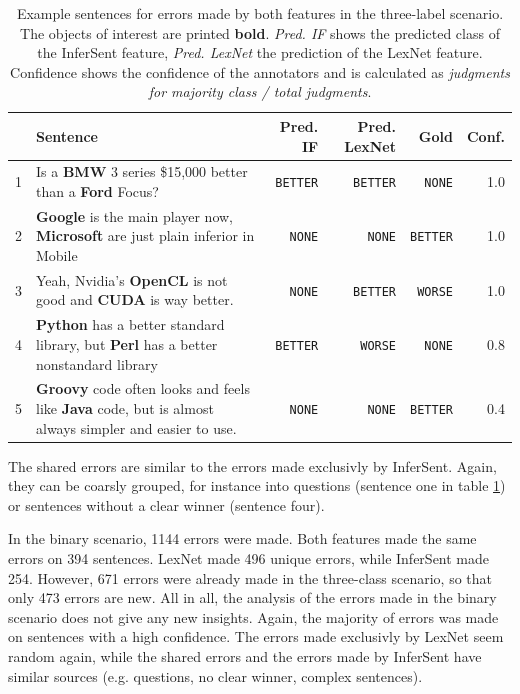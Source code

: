 \begin{table}[h]
\caption{Example sentences for errors made by both features in the three-label scenario. The objects of interest are printed \textbf{bold}. \emph{Pred. IF} shows the predicted class of the InferSent feature, \emph{Pred. LexNet} the prediction of the LexNet feature. Confidence shows the confidence of the annotators and is calculated as \emph{judgments for majority class / total judgments}.}
\label{tbl:3_mistakes_both}
\begin{tabularx}{\linewidth}{lXrrrr}
\toprule
 & Sentence & Pred. IF & Pred. LexNet & Gold & Conf. \\ \midrule
1 & Is a \textbf{BMW} 3 series \$15,000 better than a \textbf{Ford} Focus? & \texttt{BETTER} & \texttt{BETTER} & \texttt{NONE} & 1.0\\
2 & \textbf{Google} is the main player now, \textbf{Microsoft} are just plain inferior in Mobile & \texttt{NONE} & \texttt{NONE} & \texttt{BETTER} & 1.0\\
3 & Yeah, Nvidia's \textbf{OpenCL} is not good and \textbf{CUDA} is way better. & \texttt{NONE} & \texttt{BETTER} & \texttt{WORSE} & 1.0\\
4 & \textbf{Python} has a better standard library, but \textbf{Perl} has a better nonstandard library & \texttt{BETTER} & \texttt{WORSE} & \texttt{NONE} & 0.8\\
5 & \textbf{Groovy} code often looks and feels like \textbf{Java} code, but is almost always simpler and easier to use. & \texttt{NONE} & \texttt{NONE} & \texttt{BETTER} & 0.4\\

 \bottomrule
\end{tabularx}
\end{table}

The shared errors are similar to the errors made exclusivly by InferSent. Again, they can be coarsly grouped, for instance into questions (sentence one in table \ref{tbl:3_mistakes_both}) or sentences without a clear winner (sentence four).\newline

In the binary scenario, 1144 errors were made. Both features made the same errors on 394 sentences. LexNet made 496 unique errors, while InferSent made 254. However, 671 errors were already made in the three-class scenario, so that only 473 errors are new. All in all, the analysis of the errors made in the binary scenario does not give any new insights. Again, the majority of errors was made on sentences with a high confidence. The errors made exclusivly by LexNet seem random again, while the shared errors and the errors made by InferSent have similar sources (e.g. questions, no clear winner, complex sentences).

